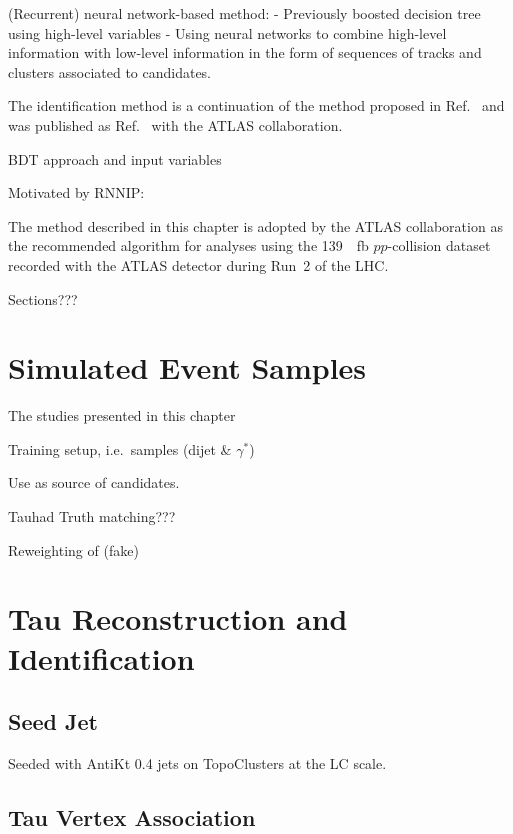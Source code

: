 (Recurrent) neural network-based method:
- Previously boosted decision tree using high-level variables
- Using neural networks to combine high-level information with
low-level information in the form of sequences of tracks and clusters
associated to \tauhadvis candidates.

The identification method is a continuation of the method proposed in
Ref.~\cite{cdeutsch-master} and was published as
Ref.~\cite{ATL-PHYS-PUB-2019-033} with the ATLAS collaboration.








BDT approach and input variables

Motivated by RNNIP: \cite{ATL-PHYS-PUB-2017-003}



The method described in this chapter is adopted by the ATLAS
collaboration as the recommended \tauid algorithm for analyses using
the \SI{139}{\per\femto\barn} $pp$-collision dataset recorded with the
ATLAS detector during Run~2 of the LHC.

Sections???




\section{Simulated Event Samples}

The studies presented in this chapter

Training setup, i.e.\ samples (dijet \& $\gamma^*$)

Use as source of \tauhadvis candidates.

Tauhad Truth matching???

Reweighting of (fake) \tauhad \pT


\section{Tau Reconstruction and Identification}


\subsection{Seed Jet}

Seeded with AntiKt 0.4 jets on TopoClusters at the LC scale.


\subsection{Tau Vertex Association}

